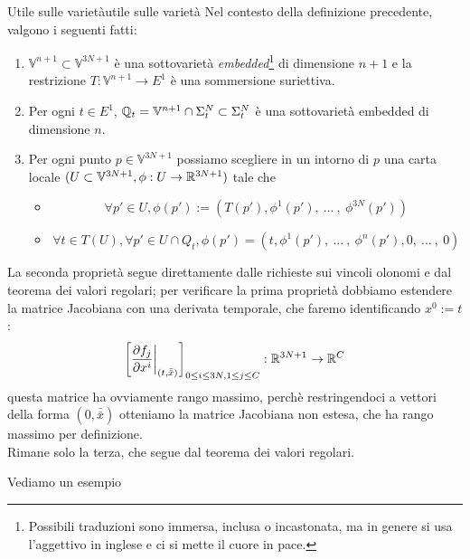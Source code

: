 \documentclass[openany]{book}
\renewcommand\V{\mathbb{V}}
\begin{document}
\begin{proposition}{Utile sulle varietà}{utile sulle varietà}
    Nel contesto della definizione precedente, valgono i seguenti fatti:\begin{enumerate}
        \item $\V^{n+1}\subset \V^{3N+1}$ è una sottovarietà \textit{embedded}\footnote{Possibili traduzioni sono immersa, inclusa o incastonata, ma in genere si usa l'aggettivo in inglese e ci si mette il cuore in pace.} di dimensione $n+1$ e la restrizione $T:\V^{n+1}\to E^1$ è una sommersione suriettiva.
        \item Per ogni $t \in E^1$, $\Q_t = \V^{n+1}\cap\Sigma_t^N \subset \Sigma_t^N$ è una sottovarietà embedded di dimensione $n$.
        \item Per ogni punto $p \in \V^{3N+1}$ possiamo scegliere in un intorno di $p$ una carta locale $(U\subset \V^{3N+1},\phi:U\to \R^{3N+1})$ tale che \begin{itemize}
            \item \[ \forall p' \in U, \phi(p') := (T(p'), \phi^1(p'),\ ...\ ,\ \phi^{3N}(p')) \]
            \item \[ \forall t \in T(U), \forall p' \in U\cap Q_t, \phi(p') = (t, \phi^1(p'),\ ...\ ,\ \phi^n(p'),0,\ ...\ ,\ 0) \]
        \end{itemize}
    \end{enumerate}
    \proof 
    La seconda proprietà segue direttamente dalle richieste sui vincoli olonomi e dal teorema dei valori regolari; per verificare la prima proprietà dobbiamo estendere la matrice Jacobiana con una derivata temporale, che faremo identificando $x^0:= t$:
    \[\left[ \frac{\partial f_j}{\partial x^i} \bigg|_{(t,\bar{\bar x})} \right]_{0\le i\le 3N,1\le j\le C} : \mathbb{R}^{3N+1}\to \mathbb{R}^C\]
    questa matrice ha ovviamente rango massimo, perchè restringendoci a vettori della forma $(0,\bar{\bar{x}})$ otteniamo la matrice Jacobiana non estesa, che ha rango massimo per definizione.\\
    Rimane solo la terza, che segue dal teorema dei valori regolari.
\end{proposition}

Vediamo un esempio
\end{document}
